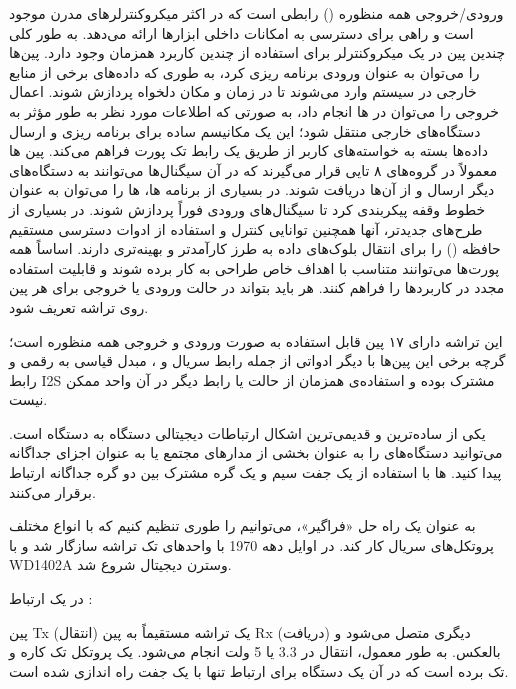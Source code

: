 ورودی/خروجی همه منظوره () رابطی است که در اکثر میکروکنترلرهای مدرن موجود است و راهی برای دسترسی به امکانات داخلی ابزارها ارائه می‌دهد. به طور کلی چندین پین  در یک میکروکنترلر برای استفاده از چندین کاربرد همزمان وجود دارد. پین‌ها را می‌توان به عنوان ورودی برنامه ریزی کرد، به طوری که داده‌های برخی از منابع خارجی در سیستم وارد می‌شوند تا در زمان و مکان دلخواه پردازش شوند. اعمال خروجی را می‌توان در ‌ها انجام داد، به صورتی که اطلاعات مورد نظر به طور مؤثر به دستگاه‌های خارجی منتقل شود؛ این یک مکانیسم ساده برای برنامه ریزی و ارسال داده‌ها بسته به خواسته‌های کاربر از طریق یک رابط تک پورت فراهم می‌کند. پین ها
معمولاً در گروه‌های ۸ تایی قرار می‌گیرند که در آن سیگنال‌ها می‌توانند به دستگاه‌های دیگر ارسال و از آن‌ها دریافت شوند. در بسیاری از برنامه ها، ‌ها را می‌توان به عنوان خطوط وقفه پیکربندی کرد
تا سیگنال‌های ورودی فوراً پردازش شوند. در بسیاری از طرح‌های جدیدتر، آنها
همچنین توانایی کنترل و استفاده از ادوات دسترسی مستقیم حافظه () را برای انتقال بلوک‌های داده به طرز کارآمدتر و بهینه‌تری دارند. اساساً همه پورت‌ها می‌توانند متناسب با اهداف خاص طراحی به کار برده شوند و قابلیت استفاده مجدد در کاربردها را فراهم کنند. هر  باید بتواند در حالت ورودی یا خروجی برای هر پین روی تراشه تعریف شود.

این تراشه دارای ۱۷ پین قابل استفاده به صورت ورودی و خروجی همه منظوره است؛ گرچه برخی این پین‌ها با دیگر ادواتی از جمله رابط سریال و ، مبدل قیاسی به رقمی و رابط I2S مشترک بوده و استفاده‌ی همزمان از حالت  ‌یا رابط دیگر در آن واحد ممکن نیست.


یکی از ساده‌ترین و قدیمی‌ترین اشکال ارتباطات دیجیتالی دستگاه به دستگاه است. می‌توانید دستگاه‌های  را به عنوان بخشی از مدارهای مجتمع یا به عنوان اجزای جداگانه پیدا کنید. ‌ها با استفاده از یک جفت سیم و یک گره مشترک بین دو گره جداگانه ارتباط برقرار می‌کنند.

به عنوان یک راه حل «فراگیر»، می‌توانیم  را طوری تنظیم کنیم که با انواع مختلف پروتکل‌های سریال کار کند.  در اوایل دهه 1970 با واحدهای تک تراشه سازگار شد و با WD1402A وسترن دیجیتال شروع شد.

در یک ارتباط :

 پین Tx (انتقال) یک تراشه مستقیماً به پین ​​Rx (دریافت) دیگری متصل می‌شود و بالعکس. به طور معمول، انتقال در 3.3 یا 5 ولت انجام می‌شود.  یک پروتکل تک کاره و تک برده است که در آن یک دستگاه برای ارتباط تنها با یک جفت راه اندازی شده است.

